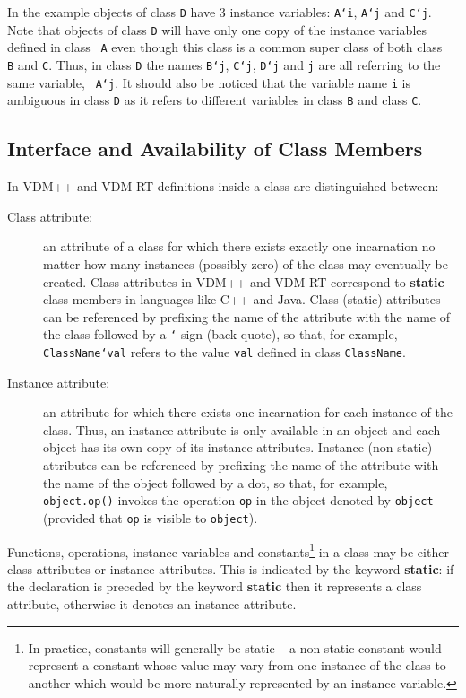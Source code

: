 \documentclass{overturerepchap}
\newcommand{\keyw}[1]{{\bf\ttfamily #1}}
\begin{document}
In the example objects of class {\tt D} have 3 instance variables:
{\tt A`i}, {\tt A`j} and {\tt C`j}. Note that objects of class {\tt D}
will have only one copy of the instance variables defined in class {\tt
A} even though this class is a common super class of both class {\tt
B} and {\tt C}. Thus, in class {\tt D} the names {\tt B`j}, {\tt C`j},
{\tt D`j} and {\tt j} are all referring to the same variable, {\tt
A`j}. It should also be noticed that the variable name {\tt i} is
ambiguous in class {\tt D} as it refers to different variables in
class {\tt B} and class {\tt C}.

\subsection{Interface and Availability of Class Members}\label{ch:interface}

In VDM++ and VDM-RT definitions inside a class are distinguished between:

\begin{description}
\item[Class attribute:] an attribute of a class for which there
  exists exactly one incarnation no matter how many instances
  (possibly zero) of the class may eventually be created. Class
  attributes in VDM++ and VDM-RT correspond to \keyw{static} class members in
  languages like C++ and Java. Class (static) attributes can be
  referenced by prefixing the name of the attribute with the name of
  the class followed by a \texttt{`}-sign (back-quote), so that, for
  example, {\tt ClassName`val} refers to the value {\tt val} defined in
  class {\tt ClassName}.

\item[Instance attribute:] an attribute for which there exists one
  incarnation for each instance of the class. Thus, an instance
  attribute is only available in an object and each object has its own
  copy of its instance attributes. Instance (non-static) attributes
  can be referenced by prefixing the name of the attribute with the name of
  the object followed by a dot, so that, for example, {\tt
    object.op()} invokes the operation {\tt op} in the object denoted
  by {\tt object} (provided that \texttt{op} is visible to
  \texttt{object}).
\end{description}

Functions, operations, instance variables and constants\footnote{In
  practice, constants will generally be static -- a non-static
  constant would represent a constant whose value may vary from one
  instance of the class to another which would be more naturally
  represented by an instance variable.} in a class may 
be either class attributes or instance attributes. This is indicated
by the keyword \keyw{static}: if the declaration is preceded by the
keyword \keyw{static} then it represents a class attribute, otherwise
it denotes an instance attribute. 
\end{document}

